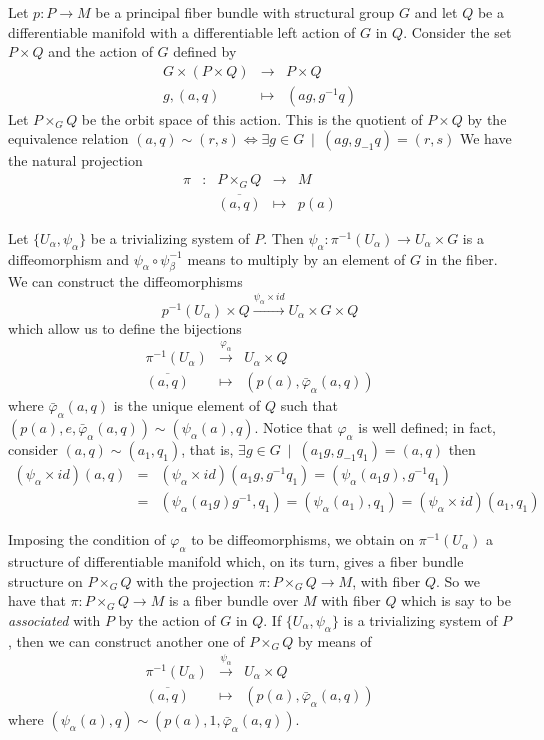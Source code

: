 \documentclass[12pt]{article}
\def\beann{\begin{eqnarray*}}
\def\eeann{\end{eqnarray*}}
\def\mapping#1{\mathrel{\mathop{\longrightarrow}\limits^{#1}}}
\begin{document}
Let $p : P \to M$ be
a principal fiber bundle with structural group $G$
and let $Q$ be a differentiable manifold
with a differentiable left action of $G$ in $Q$.
Consider the set $P \times Q$
and the action of $G$ defined by
$$\begin{array}{ccc}
G \times (P \times Q) & \to & P \times Q
\\
g,(a,q) & \mapsto & (ag, g^{-1}q)
\end{array}$$
Let $P \times_G Q$ be the orbit space of this action.
This is the quotient of $P \times Q$ by the equivalence relation
$(a,q) \sim (r,s) \Leftrightarrow \exists g \in G \
\mid \ (ag,g_{-1}q) = (r,s)$
We have the natural projection
$$
\begin{array}{ccccc}
\pi & : & P \times_G Q & \to & M
\\
& & \overline{(a,q)} & \mapsto & p(a)
\end{array}
$$

Let $\{ U_{\alpha},\psi_{\alpha} \}$ be
a trivializing system of $P$. Then
$\psi_{\alpha} : \pi^{-1}(U_{\alpha}) \to U_{\alpha} \times G$
is a diffeomorphism and
$\psi_{\alpha} \circ \psi_{\beta}^{-1}$
means to multiply by an element of $G$ in the fiber.
We can construct the diffeomorphisms
$$
p^{-1}(U_{\alpha}) \times Q \mapping{\psi_{\alpha} \times id}
U_{\alpha} \times G \times Q
$$
which allow us to define the bijections
$$\begin{array}{ccc}
\pi^{-1}(U_{\alpha}) & \mapping{\varphi_{\alpha}} & U_{\alpha} \times Q
\\
\overline{(a,q)} & \mapsto & (p(a),\bar\varphi_{\alpha}(a,q))
\end{array}$$
where $\bar\varphi_{\alpha}(a,q)$
is the unique element of $Q$ such that
$(p(a),e,\bar\varphi_{\alpha}(a,q)) \sim (\psi_{\alpha}(a),q)$.
Notice that $\varphi_{\alpha}$
is well defined; in fact,
consider $(a,q) \sim (a_1,q_1)$,
that is, $\exists g \in G \ \mid \ (a_1g,g_{-1}q_1) = (a,q)$
then
\beann
(\psi_{\alpha} \times id)(a,q) &=&
(\psi_{\alpha} \times id)(a_1g,g^{-1}q_1) =
(\psi_{\alpha}(a_1g),g^{-1}q_1)
\\ &=&
(\psi_{\alpha}(a_1g)g^{-1},q_1) =
(\psi_{\alpha}(a_1),q_1) =
(\psi_{\alpha} \times id)(a_1,q_1)
\eeann

Imposing the condition of $\varphi_{\alpha}$
to be diffeomorphisms,
we obtain on $\pi^{-1}(U_{\alpha})$
a structure of differentiable manifold which,
on its turn, gives a fiber bundle structure on
$P \times_G Q$ with the projection $\pi : P \times_G Q \to M$,
with fiber $Q$. So we have that $\pi : P \times_G Q \to M$
is a fiber bundle over $M$ with fiber $Q$ which is say to be
{\it associated} with $P$ by the action of $G$ in $Q$.
If $\{ U_{\alpha},\psi_{\alpha} \}$ is a trivializing system of $P$,
then we can construct another one of $P \times_G Q$
by means of
$$
\begin{array}{ccc}
\pi^{-1}(U_{\alpha}) & \mapping{\psi_{\alpha}} & U_{\alpha} \times Q
\\
\overline{(a,q)} & \mapsto & (p(a),\bar\varphi_{\alpha}(a,q))
\end{array}
$$
where $(\psi_{\alpha}(a),q) \sim (p(a),1,\bar\varphi_{\alpha}(a,q))$.
\end{document}
